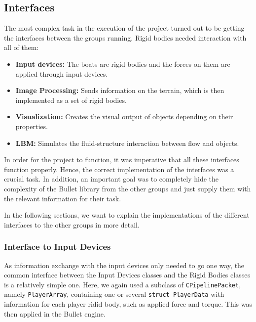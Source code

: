 \subsection{Interfaces}
The most complex task in the execution of the project turned out to be getting the interfaces between the groups running. Rigid bodies needed interaction with all of them:
\begin{itemize}
\item \textbf{Input devices:} The boats are rigid bodies and the forces on them are applied through input devices.
\item \textbf{Image Processing:} Sends information on the terrain, which is then implemented as a set of rigid bodies.
\item \textbf{Visualization:} Creates the visual output of objects depending on their properties.
\item \textbf{LBM:} Simulates the fluid-structure interaction between flow and objects.
\end{itemize}
In order for the project to function, it was imperative that all these interfaces function properly. Hence, the correct implementation of the interfaces was a crucial task.
In addition, an important goal was to completely hide the complexity of the Bullet library from the other groups and just supply them with the relevant information for their task.

In the following sections, we want to explain the implementations of the different interfaces to the other groups in more detail.

\subsubsection{Interface to Input Devices}
As information exchange with the input devices only needed to go one way, the common interface between the Input Devices classes and the Rigid Bodies classes is a relatively simple one. Here, we again used a subclass of \texttt{CPipelinePacket}, namely \texttt{PlayerArray}, containing one or several \texttt{struct PlayerData} with information for each player ridid body, such as applied force and torque. This was then applied in the Bullet engine. 

